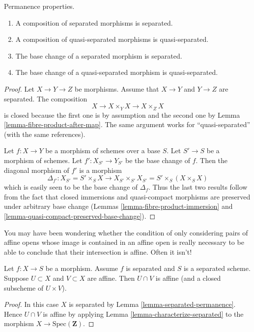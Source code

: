 \begin{lemma}
\label{lemma-separated-permanence}
Permanence properties.
\begin{enumerate}
\item A composition of separated morphisms is separated.
\item A composition of quasi-separated morphisms is quasi-separated.
\item The base change of a separated morphism is separated.
\item The base change of a quasi-separated morphism is quasi-separated.
\end{enumerate}
\end{lemma}

\begin{proof}
Let $X \to Y \to Z$ be morphisms. Assume that $X \to Y$ and
$Y \to Z$ are separated. The composition
$$
X \to X \times_Y X \to X \times_Z X
$$
is closed because the first one is by assumption and the second
one by Lemma \ref{lemma-fibre-product-after-map}. The same argument
works for ``quasi-separated'' (with the same references).

\medskip\noindent
Let $f : X \to Y$ be a morphism of schemes over a base $S$.
Let $S' \to S$ be a morphism of schemes. Let $f' : X_{S'} \to Y_{S'}$
be the base change of $f$. Then the diagonal morphism
of $f'$ is a morphism
$$
\Delta_{f'} : X_{S'} = S' \times_S X \longrightarrow X_{S'} \times_{S'} X_{S'}
= S' \times _S (X \times_S X)
$$
which is easily seen to be the base change of $\Delta_f$.
Thus the last two results follow from the fact that
closed immersions and quasi-compact morphisms are preserved
under arbitrary base change (Lemmas
\ref{lemma-fibre-product-immersion} and
\ref{lemma-quasi-compact-preserved-base-change}).
\end{proof}


\noindent
You may have been wondering whether the condition
of only considering pairs of affine opens whose image is contained
in an affine open is really necessary to be able to conclude
that their intersection is affine. Often it isn't!

\begin{lemma}
\label{lemma-curiosity}
Let $f : X \to S$ be a morphism.
Assume $f$ is separated and $S$ is a separated scheme.
Suppose $U \subset X$ and $V \subset X$ are affine.
Then $U \cap V$ is affine (and a closed subscheme of $U \times V$).
\end{lemma}

\begin{proof}
In this case $X$ is separated by Lemma \ref{lemma-separated-permanence}.
Hence $U \cap V$ is affine by
applying Lemma \ref{lemma-characterize-separated} to the
morphism $X \to \text{Spec}(\mathbf{Z})$.
\end{proof}

